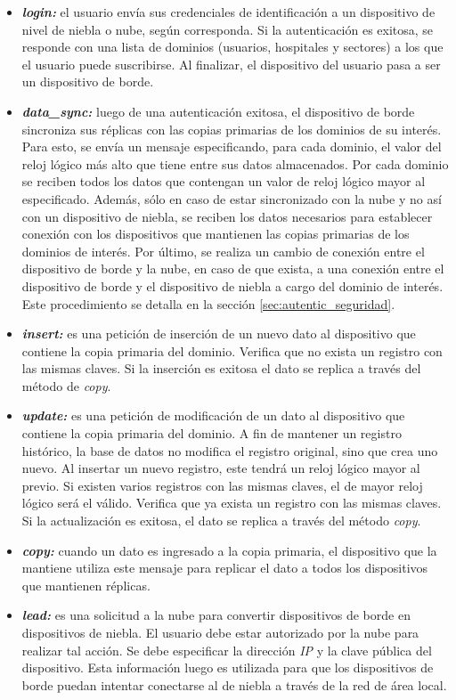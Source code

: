 \begin{itemize}
    \item \textit{\textbf{login: }}el usuario envía sus credenciales de identificación a un dispositivo de nivel de niebla o nube, según corresponda. Si la autenticación es exitosa, se responde con una lista de dominios (usuarios, hospitales y sectores) a los que el usuario puede suscribirse. Al finalizar, el dispositivo del usuario pasa a ser un dispositivo de borde.

    \item \textit{\textbf{data\_sync: }}luego de una autenticación exitosa, el dispositivo de borde sincroniza sus réplicas con las copias primarias de los dominios de su interés. Para esto, se envía un mensaje especificando, para cada dominio, el valor del reloj lógico más alto que tiene entre sus datos almacenados. Por cada dominio se reciben todos los datos que contengan un valor de reloj lógico mayor al especificado. Además, sólo en caso de estar sincronizado con la nube y no así con un dispositivo de niebla, se reciben los datos necesarios para establecer conexión con los dispositivos que mantienen las copias primarias de los dominios de interés. Por último, se realiza un cambio de conexión entre el dispositivo de borde y la nube, en caso de que exista, a una conexión entre el dispositivo de borde y el dispositivo de niebla a cargo del dominio de interés. Este procedimiento se detalla en la sección \ref{sec:autentic_seguridad}.

    \item \textit{\textbf{insert:}} es una petición de inserción de un nuevo dato al dispositivo que contiene la copia primaria del dominio. Verifica que no exista un registro con las mismas claves. Si la inserción es exitosa el dato se replica a través del método de \textit{copy}.

    \item \textit{\textbf{update:}} es una petición de modificación de un dato al dispositivo que contiene la copia primaria del dominio. A fin de mantener un registro histórico, la base de datos no modifica el registro original, sino que crea uno nuevo. Al insertar un nuevo registro, este tendrá un reloj lógico mayor al previo. Si existen varios registros con las mismas claves, el de mayor reloj lógico será el válido. Verifica que ya exista un registro con las mismas claves. Si la actualización es exitosa, el dato se replica a través del método \textit{copy}.

    \item \textit{\textbf{copy:}} cuando un dato es ingresado a la copia primaria, el dispositivo que la mantiene utiliza este mensaje para replicar el dato a todos los dispositivos que mantienen réplicas.


    \item \textit{\textbf{lead: }}es una solicitud a la nube para convertir dispositivos de borde en dispositivos de niebla. El usuario debe estar autorizado por la nube para realizar tal acción. Se debe especificar la dirección \textit{IP} y la clave pública del dispositivo. Esta información luego es utilizada para que los dispositivos de borde puedan intentar conectarse al de niebla a través de la red de área local.
\end{itemize}

